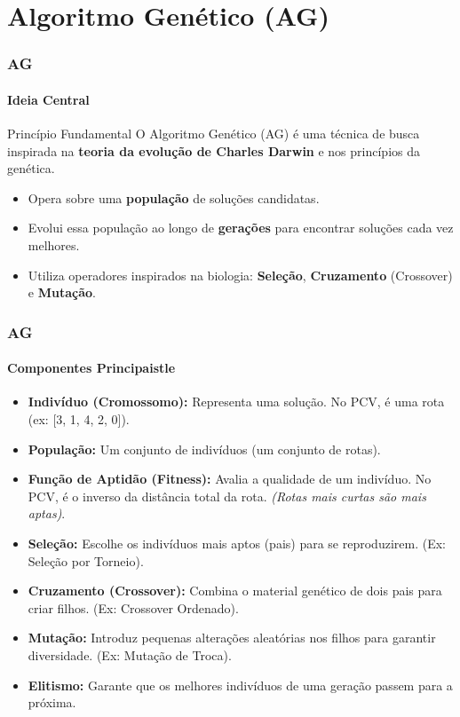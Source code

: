 \documentclass{beamer}
\begin{document}
\section{Algoritmo Genético (AG)}

\begin{frame}
  \frametitle{AG}
  \framesubtitle{Ideia Central}
  
  \begin{block}{Princípio Fundamental}
    O Algoritmo Genético (AG) é uma técnica de busca inspirada na \textbf{teoria da evolução de Charles Darwin} e nos princípios da genética.
  \end{block}
  
  \begin{itemize}
    \item Opera sobre uma \textbf{população} de soluções candidatas.
    \item Evolui essa população ao longo de \textbf{gerações} para encontrar soluções cada vez melhores.
    \item Utiliza operadores inspirados na biologia: \textbf{Seleção}, \textbf{Cruzamento} (Crossover) e \textbf{Mutação}.
  \end{itemize}
  
\end{frame}

\begin{frame}
  \frametitle{AG}
  \framesubtitle{Componentes Principaistle}
  \footnotesize
  \begin{itemize}
    \item \textbf{Indivíduo (Cromossomo):} Representa uma solução. No PCV, é uma rota (ex: [3, 1, 4, 2, 0]).
    \vspace{0.3cm}
    \item \textbf{População:} Um conjunto de indivíduos (um conjunto de rotas).
    \vspace{0.3cm}
    \item \textbf{Função de Aptidão (Fitness):} Avalia a qualidade de um indivíduo. No PCV, é o inverso da distância total da rota. \textit{(Rotas mais curtas são mais aptas)}.
    \vspace{0.3cm}
    \item \textbf{Seleção:} Escolhe os indivíduos mais aptos (pais) para se reproduzirem. (Ex: Seleção por Torneio).
    \vspace{0.3cm}
    \item \textbf{Cruzamento (Crossover):} Combina o material genético de dois pais para criar filhos. (Ex: Crossover Ordenado).
    \vspace{0.3cm}
    \item \textbf{Mutação:} Introduz pequenas alterações aleatórias nos filhos para garantir diversidade. (Ex: Mutação de Troca).
    \vspace{0.3cm}
    \item \textbf{Elitismo:} Garante que os melhores indivíduos de uma geração passem para a próxima.
  \end{itemize}
  
\end{frame}
\end{document}
